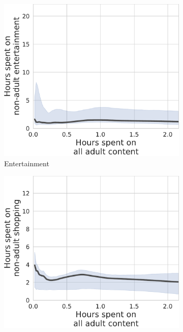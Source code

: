 \documentclass[12pt,twoside]{article}
\begin{document}
\begin{figure}[!ht]
\label{fig:tu_prop_entertainment-prop_adult_duration}
     \centering
     \begin{subfigure}[b]{0.495\textwidth}
         \centering
         \includegraphics[width=\textwidth]{figs/tu_duration_entertainment-duration_adult.pdf}
         \caption{Entertainment}
     \end{subfigure}
     \hfill
     \begin{subfigure}[b]{0.495\textwidth}
         \centering
         \includegraphics[width=\textwidth]{figs/tu_duration_shop-duration_adult.pdf}

\end{subfigure}
\end{figure}
\end{document}
